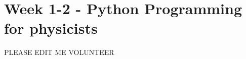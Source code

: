 \documentclass[../main.tex]{subfiles}
\begin{document}
\section{Week 1-2 - Python Programming for physicists}

PLEASE EDIT ME VOLUNTEER
\end{document}
